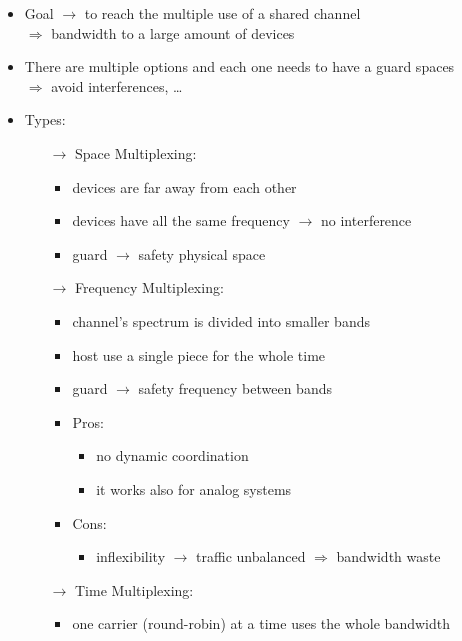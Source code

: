 \begin{itemize}
    \item Goal $\rightarrow$ to reach the multiple use of a shared channel\\
    $\Rightarrow$ bandwidth to a large amount of devices
    \item There are multiple options and each one needs to have a guard spaces\\
    $\Rightarrow$ avoid interferences, \dots
    \item Types:
    \begin{itemize}
        \item[$\rightarrow$] Space Multiplexing:
        \begin{itemize}
            \item devices are far away from each other
            \item devices have all the same frequency $\rightarrow$ no interference
            \item guard $\rightarrow$ safety physical space
        \end{itemize}
        \item[$\rightarrow$] Frequency Multiplexing:
        \begin{itemize}
            \item channel's spectrum is divided into smaller bands
            \item host use a single piece for the whole time
            \item guard $\rightarrow$ safety frequency between bands
            \newpage
            \item Pros:
            \begin{itemize}
                \item no dynamic coordination
                \item it works also for analog systems
            \end{itemize}
            \item Cons:
            \begin{itemize}
                \item inflexibility $\rightarrow$ traffic unbalanced $\Rightarrow$ bandwidth waste
            \end{itemize}
        \end{itemize}
        \item[$\rightarrow$] Time Multiplexing:
        \begin{itemize}
            \item one carrier (round-robin) at a time uses the whole bandwidth

\end{itemize}
\end{itemize}
\end{itemize}
